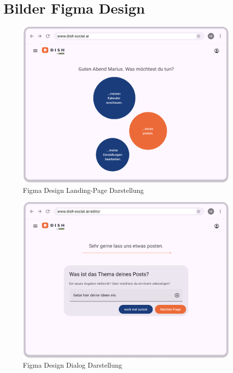 \section{Bilder Figma Design}\label{sec:bilder-figma-design}
\begin{figure}[htbp]
    \centering
    \includegraphics[width=\textwidth]{abbildungen/figma/Landing Page}
    \caption[]{Figma Design Landing-Page Darstellung}
    \label{fig:landing-page}
\end{figure}
\newpage

\begin{figure}[htbp]
    \centering
    \includegraphics[width=\textwidth]{abbildungen/figma/Dialog}
    \caption[]{Figma Design Dialog Darstellung}
    \label{fig:dialog-page}
\end{figure}
\newpage

